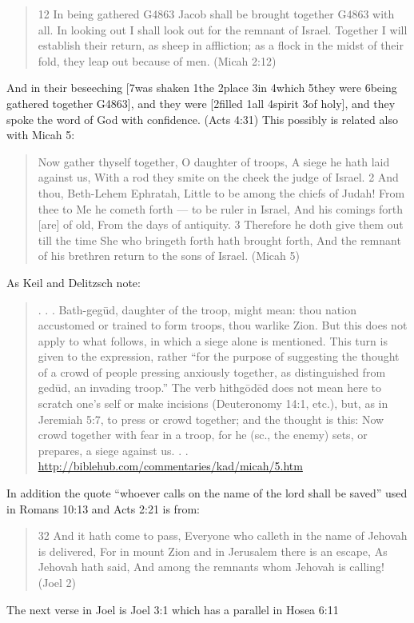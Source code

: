 \documentclass[11pt]{article}
\begin{document}
\begin{quote}
12 In being gathered G4863 Jacob shall be brought together G4863 with all. In looking out I shall look out for the remnant of Israel. Together I will establish their return, as sheep in affliction; as a flock in the midst of their fold, they leap out because of men. (Micah 2:12)
\end{quote}
And in their beseeching [7was shaken 1the 2place 3in 4which 5they were 6being gathered together G4863], and they were [2filled 1all 4spirit 3of holy], and they spoke the word of God with confidence. (Acts 4:31) This possibly is related also with Micah 5:
\begin{quote}
Now gather thyself together, O daughter of troops, A siege he hath laid against us, With a rod they smite on the cheek the judge of Israel.
2 And thou, Beth-Lehem Ephratah, Little to be among the chiefs of Judah! From thee to Me he cometh forth — to be ruler in Israel, And his comings forth [are] of old, From the days of antiquity.
3 Therefore he doth give them out till the time She who bringeth forth hath brought forth, And the remnant of his brethren return to the sons of Israel. (Micah 5)
\end{quote}
As Keil and Delitzsch note:
\begin{quote}
. . . Bath-gegūd, daughter of the troop, might mean: thou nation accustomed or trained to form troops, thou warlike Zion. But this does not apply to what follows, in which a siege alone is mentioned. This turn is given to the expression, rather “for the purpose of suggesting the thought of a crowd of people pressing anxiously together, as distinguished from gedūd, an invading troop.” The verb hithgōdēd does not mean here to scratch one’s self or make incisions (Deuteronomy 14:1, etc.), but, as in Jeremiah 5:7, to press or crowd together; and the thought is this: Now crowd together with fear in a troop, for he (sc., the enemy) sets, or prepares, a siege against us. . .
\url{http://biblehub.com/commentaries/kad/micah/5.htm}
\end{quote}
In addition the quote “whoever calls on the name of the lord shall be saved” used in Romans 10:13 and Acts 2:21 is from:
\begin{quote}
32 And it hath come to pass, Everyone who calleth in the name of Jehovah is delivered, For in mount Zion and in Jerusalem there is an escape, As Jehovah hath said, And among the remnants whom Jehovah is calling! (Joel 2)
\end{quote}
The next verse in Joel is Joel 3:1 which has a parallel in Hosea 6:11
\end{document}

